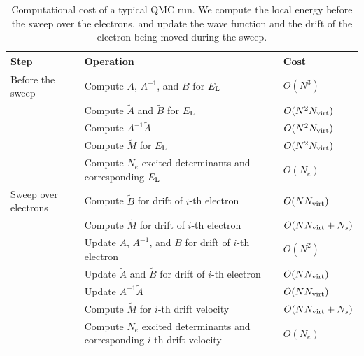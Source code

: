 \documentclass[aip,jcp,reprint,floatfix,onecolumn]{revtex4-1}
\begin{document}
\begin{table}
\begin{tabular}{lll}
\hline
Step & Operation & Cost\\
\hline
Before the sweep     & Compute $A$, $A^{-1}$, and $B$ for $E_{\rm L}$                                                           & $O(N^3)$ \\
                     & Compute $\tilde{A}$ and $\tilde{B}$ for $E_{\rm L}$                                                      & $O(N^2 N_{\rm virt})$ \\
                     & Compute $A^{-1}\tilde{A}$                                                                                & $O(N^2 N_{\rm virt})$ \\
                     & Compute $\tilde{M}$ for $E_{\rm L}$                                                                      & $O(N^2 N_{\rm virt})$~\cite{act_virt} \\
                     & Compute $N_e$ excited determinants and corresponding $E_{\rm L}$                                         & $O(N_e)$ \\
Sweep over electrons & Compute $\tilde{B}$ for drift of $i$-th electron                                                         & $O(N N_{\rm virt})$ \\
                     & Compute $\tilde{M}$ for drift of $i$-th electron                                                         & $O(N N_{\rm virt}+ N_s)$ \\
                     & Update $A$, $A^{-1}$, and $B$ for drift of $i$-th electron                                               & $O(N^2)$ \\
                     & Update $\tilde{A}$ and $\tilde{B}$ for drift of $i$-th electron                                          & $O(N N_{\rm virt})$ \\
                     & Update $A^{-1}\tilde{A}$                                                                                 & $O(N N_{\rm virt})$ \\
                     & Compute $\tilde{M}$ for $i$-th drift velocity                                                            & $O(N N_{\rm virt}+N_s)$ \\
                     & Compute $N_e$ excited determinants and corresponding $i$-th drift velocity                               & $O(N_e)$ \\
\hline
\end{tabular}
\caption{Computational cost of a typical QMC run. We compute the local energy before the sweep over the electrons, and update the wave function and the drift of the electron being moved during the sweep.}
\label{table:scaling}
\end{table}
\end{document}

